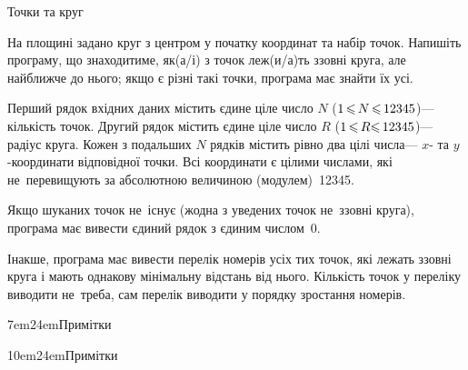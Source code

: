 {

\begin{problemAllDefault}{Точки та круг}

На площині задано круг з центром у початку координат та набір точок.
Напишіть програму, що знаходитиме, як(а/і) з точок леж(и/а)ть ззовні круга, але найближче до нього; якщо є різні такі точки, програма має знайти їх усі.

\InputFile
Перший рядок вхідних даних містить єдине ціле число $N$ (${1\,{\leqslant}\,N\,{\leqslant}\,12345}$)\nolinebreak[3] --- кількість точок. Другий рядок містить єдине ціле число $R$ (${1\,{\leqslant}\,R{\leqslant}\,12345}$)\nolinebreak[3] --- радіус круга. Кожен з подальших $N$ рядків містить рівно два цілі числа\nolinebreak[3] --- $x$- та $y$-координати відповідної точки. Всі координати є цілими числами, які не~перевищують за абсолютною величиною (модулем)~12345.

\OutputFile
Якщо шуканих точок не~існує (жодна з уведених точок не~ззовні круга), програма має  вивести єдиний рядок з єдиним числом~0.

Інакше, програма має вивести перелік номерів усіх тих точок, які лежать ззовні круга і мають однакову мінімальну відстань від нього. Кількість точок у переліку виводити не~треба, сам перелік виводити у порядку зростання номерів.



\Examples

\ifAfour
\vspace*{-0.75\baselineskip}
\fi
\noindent
\ifAfour
\hspace*{-1.25em}
\fi
\begin{exampleSimpleThree}{5em}{5em}{\ifAfour 7em\else24em\fi}{Примітки}
%
\ifAfour%
\end{exampleSimpleThree}%
\hspace{-2em}
\begin{exampleSimpleThree}{5em}{5em}{\ifAfour 10em\else24em\fi}{Примітки}
\fi
{}%
\end{exampleSimpleThree}

\end{problemAllDefault}

}